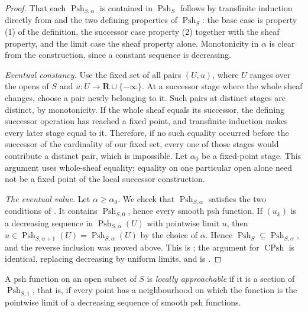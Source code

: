 \begin{proof}
That each $\operatorname{Psh}_{S,\alpha}$ is contained in
$\operatorname{Psh}_S$ follows by transfinite induction directly from
 and the two defining properties of
$\operatorname{Psh}_S$: the base case is property (1) of the definition, the
successor case property (2) together with the sheaf property, and the limit
case the sheaf property alone.  Monotonicity in $\alpha$ is clear from the
construction, since a constant sequence is decreasing.

\emph{Eventual constancy.}  Use the fixed set of all pairs $(U,u)$,
where $U$ ranges over the opens of $S$ and
$u:U\to\mathbf R\cup\{-\infty\}$.  At a successor stage where the
whole sheaf changes, choose a pair newly belonging to it.  Such pairs at
distinct stages are distinct, by monotonicity.  If the whole sheaf equals
its successor, the defining successor operation has reached a fixed point,
and transfinite induction makes every later stage equal to it.  Therefore,
if no such equality occurred before the successor of the cardinality of
our fixed set, every one of those stages would contribute a distinct pair,
which is impossible.  Let $\alpha_0$ be a fixed-point stage.  This argument
uses whole-sheaf equality; equality on one particular open alone need not
be a fixed point of the local successor construction.

\emph{The eventual value.}  Let $\alpha\ge\alpha_0$.  We check that
$\operatorname{Psh}_{S,\alpha}$ satisfies the two conditions of
.  It contains $\operatorname{Psh}_{S,0}$, hence
every smooth psh function.  If $(u_k)$ is a decreasing sequence in
$\operatorname{Psh}_{S,\alpha}(U)$ with pointwise limit $u$, then
$u\in\operatorname{Psh}_{S,\alpha+1}(U)=\operatorname{Psh}_{S,\alpha}(U)$ by
the choice of $\alpha$.  Hence
$\operatorname{Psh}_S\subseteq\operatorname{Psh}_{S,\alpha}$, and the reverse
inclusion was proved above.  This is \cite[Lemma~8.1.4]{CLD25}; the argument
for $\operatorname{CPsh}$ is identical, replacing decreasing by uniform
limits, and is \cite[Lemma~8.1.8]{CLD25}.
\end{proof}

\begin{definition}
\label{def:ch15-approachable}
A psh function on an open subset of $S$ is \emph{locally approachable} if it
is a section of $\operatorname{Psh}_{S,1}$, that is, if every point has a
neighbourhood on which the function is the pointwise limit of a decreasing
sequence of smooth psh functions.
\end{definition}

